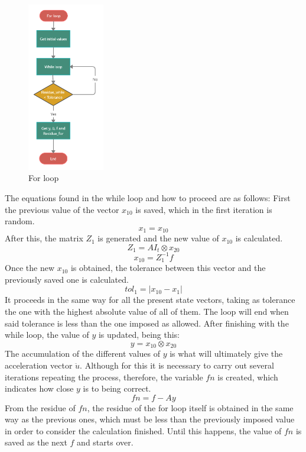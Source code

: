\documentclass{ws-m3as}
\begin{document}
\begin{figure}
\centering
\includegraphics[width=0.30\textwidth]{For loop (1).png}
\caption{For loop} 
\label{For loop}
\end{figure}

The equations found in the while loop and how to proceed are as follows: First the previous value of the vector $x_10$ is saved, which in the first iteration is random.
\begin{equation}
    x_{1} = x_{10}
\end{equation}
After this, the matrix $Z_1$ is generated and the new value of $x_{10}$ is calculated.
\begin{equation}
    Z_1 = A I_t \otimes  x_{20}
\end{equation}
\begin{equation}
    x_{10} = Z_1^{-1} f
\end{equation}
Once the new $x_{10}$ is obtained, the tolerance between this vector and the previously saved one is calculated.
\begin{equation}
    tol_1 = |x_{10}-x_1|
\end{equation}
It proceeds in the same way for all the present state vectors, taking as tolerance the one with the highest absolute value of all of them. The loop will end when said tolerance is less than the one imposed as allowed. After finishing with the while loop, the value of $y$ is updated, being this:
\begin{equation}
    y = x_{10} \otimes  x_{20}
\end{equation}
The accumulation of the different values of $y$ is what will ultimately give the acceleration vector $\ddot{u}$. Although for this it is necessary to carry out several iterations repeating the process, therefore, the variable $fn$ is created, which indicates how close $y$ is to being correct.
\begin{equation}
    fn = f - A y
\end{equation}
From the residue of $fn$, the residue of the for loop itself is obtained in the same way as the previous ones, which must be less than the previously imposed value in order to consider the calculation finished. Until this happens, the value of $fn$ is saved as the next $f$ and starts over.
\end{document}
